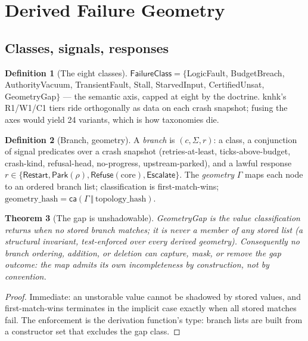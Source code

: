 \documentclass[11pt,a4paper]{article}
\newtheorem{theorem}{Theorem}[section]
\theoremstyle{definition}
\newtheorem{definition}[theorem]{Definition}
\theoremstyle{remark}
\newcommand{\ca}{\mathsf{ca}}
\newcommand{\Geo}{\Gamma}
\begin{document}
\section{Derived Failure Geometry}

\subsection{Classes, signals, responses}

\begin{definition}[The eight classes]
$\mathsf{FailureClass} = \{$\textsf{LogicFault}, \textsf{BudgetBreach},
\textsf{AuthorityVacuum}, \textsf{TransientFault}, \textsf{Stall},
\textsf{StarvedInput}, \textsf{CertifiedUnsat},
\textsf{GeometryGap}$\}$ --- the semantic axis, capped at eight by the
doctrine. knhk's R1/W1/C1 tiers ride orthogonally as data on each crash
snapshot; fusing the axes would yield 24 variants, which is how
taxonomies die.
\end{definition}

\begin{definition}[Branch, geometry]
A \emph{branch} is $(c, \Sigma, r)$: a class, a conjunction of signal
predicates over a crash snapshot (retries-at-least, ticks-above-budget,
crash-kind, refusal-head, no-progress, upstream-parked), and a lawful
response $r \in \{\textsf{Restart}, \textsf{Park}(\rho),
\textsf{Refuse}(\mathrm{core}), \textsf{Escalate}\}$. The \emph{geometry}
$\Geo$ maps each node to an ordered branch list; classification is
first-match-wins; $\mathrm{geometry\_hash} = \ca(\Geo \,\Vert\,
\mathrm{topology\_hash})$.
\end{definition}

\begin{theorem}[The gap is unshadowable]
\label{thm:gap}
\textsf{GeometryGap} is the value classification returns when no stored
branch matches; it is never a member of any stored list (a structural
invariant, test-enforced over every derived geometry). Consequently no
branch ordering, addition, or deletion can capture, mask, or remove the
gap outcome: the map admits its own incompleteness \emph{by construction},
not by convention.
\end{theorem}

\begin{proof}
Immediate: an unstorable value cannot be shadowed by stored values, and
first-match-wins terminates in the implicit case exactly when all stored
matches fail. The enforcement is the derivation function's type: branch
lists are built from a constructor set that excludes the gap class.
\end{proof}
\end{document}
